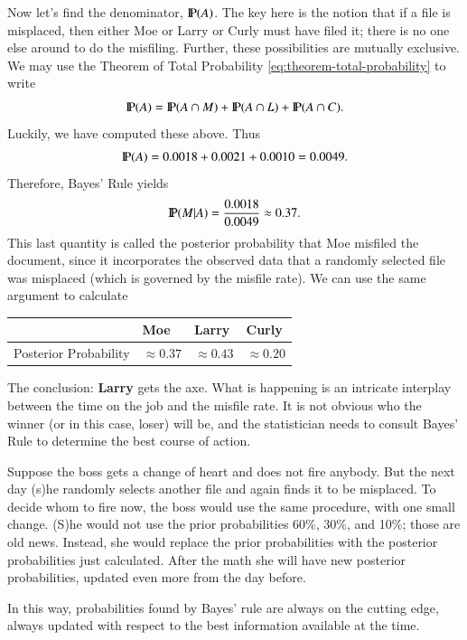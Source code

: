 \documentclass[captions=tableheading]{scrbook}
\begin{document}
\begin{example}
Now let's find the denominator, \(\P(A)\). The key here is the notion that if a file is misplaced, then either Moe or Larry or Curly must have filed it; there is no one else around to do the misfiling. Further, these possibilities are mutually exclusive. We may use the Theorem of Total Probability \ref{eq:theorem-total-probability} to write
\[ 
\P(A)=\P(A\cap M)+\P(A\cap L)+\P(A\cap C).
\]
Luckily, we have computed these above. Thus
\[
\P(A)=0.0018+0.0021+0.0010=0.0049.
\]
Therefore, Bayes' Rule yields
\[
\P(M|A)=\frac{0.0018}{0.0049}\approx0.37.
\]
This last quantity is called the posterior probability that Moe misfiled the document, since it incorporates the observed data that a randomly selected file was misplaced (which is governed by the misfile rate). We can use the same argument to calculate

\begin{center}
\begin{tabular}{llll}
                        &  Moe              &  Larry            &  Curly            \\
\hline
 Posterior Probability  &  \(\approx0.37\)  &  \(\approx0.43\)  &  \(\approx0.20\)  \\
\end{tabular}
\end{center}


The conclusion: \textbf{Larry} gets the axe. What is happening is an intricate interplay between the time on the job and the misfile rate. It is not obvious who the winner (or in this case, loser) will be, and the statistician needs to consult Bayes' Rule to determine the best course of action.
\end{example}

\begin{example}
\label{exa:misfiling-assistants-multiple}
Suppose the boss gets a change of heart and does not fire anybody. But the next day (s)he randomly selects another file and again finds it to be misplaced. To decide whom to fire now, the boss would use the same procedure, with one small change. (S)he would not use the prior probabilities 60\%, 30\%, and 10\%; those are old news. Instead, she would replace the prior probabilities with the posterior probabilities just calculated. After the math she will have new posterior probabilities, updated even more from the day before.

In this way, probabilities found by Bayes' rule are always on the cutting edge, always updated with respect to the best information available at the time.
\end{example}
\end{document}

